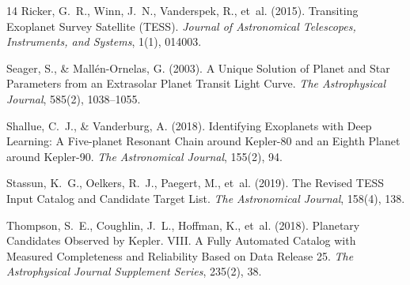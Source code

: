 \documentclass[11pt,a4paper]{article}
\begin{document}
\begin{thebibliography}{14}
Ricker, G.~R., Winn, J.~N., Vanderspek, R., et~al. (2015).
Transiting Exoplanet Survey Satellite (TESS).
\textit{Journal of Astronomical Telescopes, Instruments, and Systems}, 1(1), 014003.

Seager, S., \& Mall{\'e}n-Ornelas, G. (2003).
A Unique Solution of Planet and Star Parameters from an Extrasolar Planet Transit Light Curve.
\textit{The Astrophysical Journal}, 585(2), 1038--1055.

Shallue, C.~J., \& Vanderburg, A. (2018).
Identifying Exoplanets with Deep Learning: A Five-planet Resonant Chain around Kepler-80 and an Eighth Planet around Kepler-90.
\textit{The Astronomical Journal}, 155(2), 94.

Stassun, K.~G., Oelkers, R.~J., Paegert, M., et~al. (2019).
The Revised TESS Input Catalog and Candidate Target List.
\textit{The Astronomical Journal}, 158(4), 138.

Thompson, S.~E., Coughlin, J.~L., Hoffman, K., et~al. (2018).
Planetary Candidates Observed by Kepler. VIII. A Fully Automated Catalog with Measured Completeness and Reliability Based on Data Release 25.
\textit{The Astrophysical Journal Supplement Series}, 235(2), 38.

\end{thebibliography}
\end{document}
